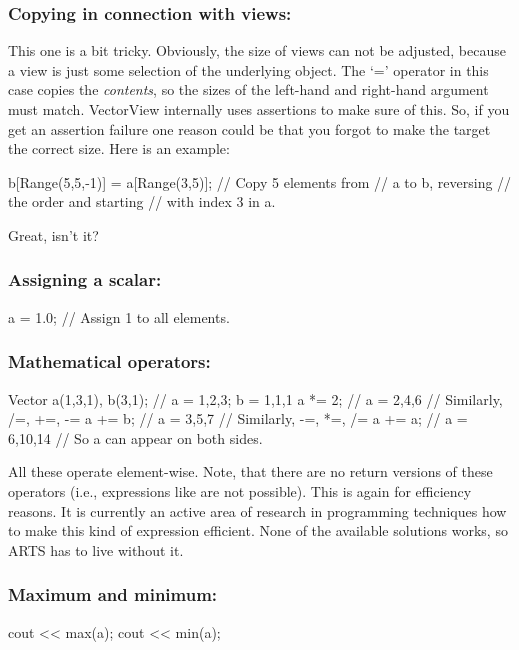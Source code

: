 \subsubsection{Copying in connection with views:}
This one is a bit tricky. Obviously, the size of views can not be
adjusted, because a view is just some selection of the underlying
object. The `=' operator in this case copies the
\emph{contents}, so the sizes of the left-hand and right-hand argument
must match. VectorView internally uses assertions to make sure of
this. So, if you get an assertion failure one reason could be that you
forgot to make the target the correct size. Here is an example:
\begin{code}
b[Range(5,5,-1)] = a[Range(3,5)];  // Copy 5 elements from 
                                   // a to b, reversing 
                                   // the order and starting
                                   // with index 3 in a.
\end{code}
Great, isn't it?

\subsubsection{Assigning a scalar:}
\begin{code}
a = 1.0;                        // Assign 1 to all elements.
\end{code}

\subsubsection{Mathematical operators:}
\begin{code}
Vector a(1,3,1), b(3,1); // a = 1,2,3; b = 1,1,1
a *= 2;                  // a = 2,4,6
                         // Similarly, /=, +=, -=
a += b;                  // a = 3,5,7
                         // Similarly, -=, *=, /=
a += a;                  // a = 6,10,14
                         // So a can appear on both sides.
\end{code}

All these operate element-wise.  Note, that there are no return
versions of these operators (i.e., expressions like  are
not possible). This is again for efficiency reasons. It is currently
an active area of research in programming techniques how to make this
kind of expression efficient. None of the available solutions works,
so ARTS has to live without it.

\subsubsection{Maximum and minimum:}
\begin{code}
cout << max(a);
cout << min(a);
\end{code}

